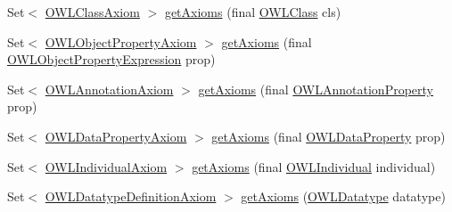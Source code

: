 \begin{DoxyCompactItemize}
\item 
Set$<$ \hyperlink{interfaceorg_1_1semanticweb_1_1owlapi_1_1model_1_1_o_w_l_class_axiom}{O\-W\-L\-Class\-Axiom} $>$ \hyperlink{classuk_1_1ac_1_1manchester_1_1cs_1_1owl_1_1owlapi_1_1_o_w_l_ontology_impl_a61ae40f4d12a9ea1e865c805bfd89656}{get\-Axioms} (final \hyperlink{interfaceorg_1_1semanticweb_1_1owlapi_1_1model_1_1_o_w_l_class}{O\-W\-L\-Class} cls)
\item 
Set$<$ \hyperlink{interfaceorg_1_1semanticweb_1_1owlapi_1_1model_1_1_o_w_l_object_property_axiom}{O\-W\-L\-Object\-Property\-Axiom} $>$ \hyperlink{classuk_1_1ac_1_1manchester_1_1cs_1_1owl_1_1owlapi_1_1_o_w_l_ontology_impl_aaeb688a85758cab06c6f258bde1a3ad5}{get\-Axioms} (final \hyperlink{interfaceorg_1_1semanticweb_1_1owlapi_1_1model_1_1_o_w_l_object_property_expression}{O\-W\-L\-Object\-Property\-Expression} prop)
\item 
Set$<$ \hyperlink{interfaceorg_1_1semanticweb_1_1owlapi_1_1model_1_1_o_w_l_annotation_axiom}{O\-W\-L\-Annotation\-Axiom} $>$ \hyperlink{classuk_1_1ac_1_1manchester_1_1cs_1_1owl_1_1owlapi_1_1_o_w_l_ontology_impl_a64f231288c4354b2394ecb5c469406ae}{get\-Axioms} (final \hyperlink{interfaceorg_1_1semanticweb_1_1owlapi_1_1model_1_1_o_w_l_annotation_property}{O\-W\-L\-Annotation\-Property} prop)
\item 
Set$<$ \hyperlink{interfaceorg_1_1semanticweb_1_1owlapi_1_1model_1_1_o_w_l_data_property_axiom}{O\-W\-L\-Data\-Property\-Axiom} $>$ \hyperlink{classuk_1_1ac_1_1manchester_1_1cs_1_1owl_1_1owlapi_1_1_o_w_l_ontology_impl_a4844fc7b3a7aab0c2ab47fa9b00e497c}{get\-Axioms} (final \hyperlink{interfaceorg_1_1semanticweb_1_1owlapi_1_1model_1_1_o_w_l_data_property}{O\-W\-L\-Data\-Property} prop)
\item 
Set$<$ \hyperlink{interfaceorg_1_1semanticweb_1_1owlapi_1_1model_1_1_o_w_l_individual_axiom}{O\-W\-L\-Individual\-Axiom} $>$ \hyperlink{classuk_1_1ac_1_1manchester_1_1cs_1_1owl_1_1owlapi_1_1_o_w_l_ontology_impl_ae915a0b198492f0817a9e0ab36b9404e}{get\-Axioms} (final \hyperlink{interfaceorg_1_1semanticweb_1_1owlapi_1_1model_1_1_o_w_l_individual}{O\-W\-L\-Individual} individual)
\item 
Set$<$ \hyperlink{interfaceorg_1_1semanticweb_1_1owlapi_1_1model_1_1_o_w_l_datatype_definition_axiom}{O\-W\-L\-Datatype\-Definition\-Axiom} $>$ \hyperlink{classuk_1_1ac_1_1manchester_1_1cs_1_1owl_1_1owlapi_1_1_o_w_l_ontology_impl_a96be8d42d53a79aef7fd9ee72226fd5b}{get\-Axioms} (\hyperlink{interfaceorg_1_1semanticweb_1_1owlapi_1_1model_1_1_o_w_l_datatype}{O\-W\-L\-Datatype} datatype)
\item 

\end{DoxyCompactItemize}
